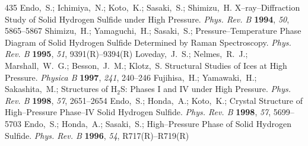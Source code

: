 \documentclass[12pt,letterpaper,oneside]{article}
\begin{document}
\begin{mcitethebibliography}{435}
\EndOfBibitem
{}
Endo,~S.; Ichimiya,~N.; Koto,~K.; Sasaki,~S.; Shimizu,~H. X--ray--Diffraction
  Study of Solid Hydrogen Sulfide under High Pressure. \emph{Phys. Rev. B}
  \textbf{1994}, \emph{50}, 5865--5867\relax
\mciteBstWouldAddEndPuncttrue
\mciteSetBstMidEndSepPunct{\mcitedefaultmidpunct}
{\mcitedefaultendpunct}{\mcitedefaultseppunct}\relax
\EndOfBibitem
{}
Shimizu,~H.; Yamaguchi,~H.; Sasaki,~S.; 
  Pressure--Temperature Phase Diagram of Solid Hydrogen Sulfide Determined by
  Raman Spectroscopy. \emph{Phys. Rev. B} \textbf{1995}, \emph{51},
  9391(R)--9394(R)\relax
\mciteBstWouldAddEndPuncttrue
\mciteSetBstMidEndSepPunct{\mcitedefaultmidpunct}
{\mcitedefaultendpunct}{\mcitedefaultseppunct}\relax
\EndOfBibitem
{}
Loveday,~J.~S.; Nelmes,~R.~J.; Marshall,~W.~G.; Besson,~J.~M.; Klotz,~S.
    Structural Studies of Ices at High Pressure. \emph{Physica B}
  \textbf{1997}, \emph{241}, 240--246\relax
\mciteBstWouldAddEndPuncttrue
\mciteSetBstMidEndSepPunct{\mcitedefaultmidpunct}
{\mcitedefaultendpunct}{\mcitedefaultseppunct}\relax
\EndOfBibitem
{}
Fujihisa,~H.; Yamawaki,~H.; Sakashita,~M.; 
  Structures of H$_2$S: Phases I and IV under High Pressure. \emph{Phys. Rev.
  B} \textbf{1998}, \emph{57}, 2651--2654\relax
\mciteBstWouldAddEndPuncttrue
\mciteSetBstMidEndSepPunct{\mcitedefaultmidpunct}
{\mcitedefaultendpunct}{\mcitedefaultseppunct}\relax
\EndOfBibitem
{}
Endo,~S.; Honda,~A.; Koto,~K.; 
  Crystal Structure of High--Pressure Phase--IV Solid Hydrogen Sulfide.
  \emph{Phys. Rev. B} \textbf{1998}, \emph{57}, 5699--5703\relax
\mciteBstWouldAddEndPuncttrue
\mciteSetBstMidEndSepPunct{\mcitedefaultmidpunct}
{\mcitedefaultendpunct}{\mcitedefaultseppunct}\relax
\EndOfBibitem
{}
Endo,~S.; Honda,~A.; Sasaki,~S.; 
  High--Pressure Phase of Solid Hydrogen Sulfide. \emph{Phys. Rev. B}
  \textbf{1996}, \emph{54}, R717(R)--R719(R)\relax
\mciteBstWouldAddEndPuncttrue
\mciteSetBstMidEndSepPunct{\mcitedefaultmidpunct}

\end{mcitethebibliography}
\end{document}
